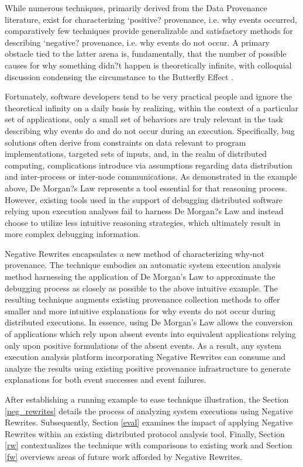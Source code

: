 While numerous techniques, primarily derived from the Data Provenance literature, exist for characterizing `positive? provenance, i.e. why events occurred, comparatively few techniques provide generalizable and satisfactory methods for describing `negative? provenance, i.e. why events do not occur.  A primary obstacle tied to the latter arena is, fundamentally, that the number of possible causes for why something didn?t happen is theoretically infinite, with colloquial discussion condensing the circumstance to the Butterfly Effect \cite{10.1007/978-3-319-12688-3_6}.

Fortunately, software developers tend to be very practical people and ignore the theoretical infinity on a daily basis by realizing, within the context of a particular set of applications, only a small set of behaviors are truly relevant in the task describing why events do and do not occur during an execution. Specifically, bug solutions often derive from constraints on data relevant to program implementations, targeted sets of inputs, and, in the realm of distributed computing, complications introduce via assumptions regarding data distribution and inter-process or inter-node communications. As demonstrated in the example above, De Morgan?s Law represents a tool essential for that reasoning process. However, existing tools used in the support of debugging distributed software relying upon execution analyses fail to harness De Morgan?s Law and instead choose to utilize less intuitive reasoning strategies, which ultimately result in more complex debugging information.

Negative Rewrites encapsulates a new method of characterizing why-not provenance. The technique embodies an automatic system execution analysis method harnessing the application of De Morgan's Law to approximate the debugging process as closely as possible to the above intuitive example. The resulting technique augments existing provenance collection methods to offer smaller and more intuitive explanations for why events do not occur during distributed executions. In essence, using De Morgan's Law allows the conversion of applications which rely upon absent events into equivalent applications relying only upon positive formulations of the absent events. As a result, any system execution analysis platform incorporating Negative Rewrites can consume and analyze the results using existing positive provenance infrastructure to generate explanations for both event successes and event failures. 

After establishing a running example to ease technique illustration, the Section \ref{neg_rewrites} details the process of analyzing system executions using Negative Rewrites. Subsequently, Section \ref{eval} examines the impact of applying Negative Rewrites within an existing distributed protocol analysis tool. Finally, Section \ref{rw} contextualizes the technique with comparisons to existing work and Section \ref{fw} overviews areas of future work afforded by Negative Rewrites. 

